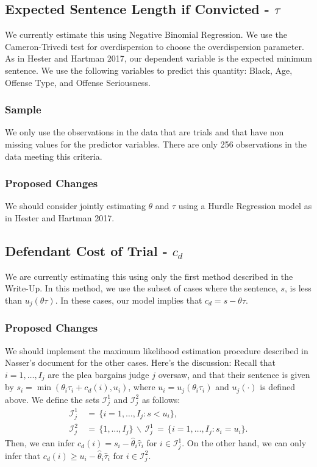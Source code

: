 \documentclass[11pt]{article}
\theoremstyle{ModifiedStyle}
\theoremstyle{ModifiedStyle}
\begin{document}
  \subsection{Expected Sentence Length if Convicted - $\tau$}
    We currently estimate this using Negative Binomial Regression. We use the Cameron-Trivedi test for overdispersion to choose the overdispersion parameter. As in Hester and Hartman 2017, our dependent variable is the expected minimum sentence. We use the following variables to predict this quantity: Black, Age, Offense Type, and Offense Seriousness.

    \subsubsection{Sample}
      We only use the observations in the data that are trials and that have non missing values for the predictor variables. There are only 256 observations in the data meeting this criteria.

    \subsubsection{Proposed Changes}
      We should consider jointly estimating $\theta$ and $\tau$ using a Hurdle Regression model as in Hester and Hartman 2017.

  \subsection{Defendant Cost of Trial - $c_d$}
    We are currently estimating this using only the first method described in the Write-Up. In this method, we use the subset of cases where the sentence, $s$, is less than $u_j(\theta \tau)$. In these cases, our model implies that $c_d = s - \theta \tau$.

    \subsubsection{Proposed Changes}
      We should implement the maximum likelihood estimation procedure described in Nasser's document for the other cases. Here's the discussion:
      Recall that $i=1,\ldots,I_j$ are the plea bargains judge $j$ oversaw, and that their sentence is given by $s_i=\min(\theta_i\tau_i+c_d(i),u_i)$, where $u_i = u_j(\theta_i\tau_i)$ and $u_j(\cdot)$ is defined above. We define the sets $\mathcal{I}_j^1$ and $\mathcal{I}_j^2$ as follows:
  			\begin{align*}
  				\mathcal{I}_j^1 &\,=\, \{i=1,\ldots,I_j: s < u_i\}, \\
  				\mathcal{I}_j^2 &\,=\, \{1,\ldots,I_j\} \,\backslash\, \mathcal{I}_j^1 \,=\, \{i=1,\ldots,I_j:s_i=u_i\}.
  			\end{align*}
  			Then, we can infer $c_d(i) = s_i - \hat{\theta}_i\hat{\tau}_i$ for $i\in\mathcal{I}_j^1$. On the other hand, we can only infer that $c_d(i) \geq u_i - \hat{\theta}_i\hat{\tau}_i$ for $i\in\mathcal{I}^2_j$.
\end{document}
